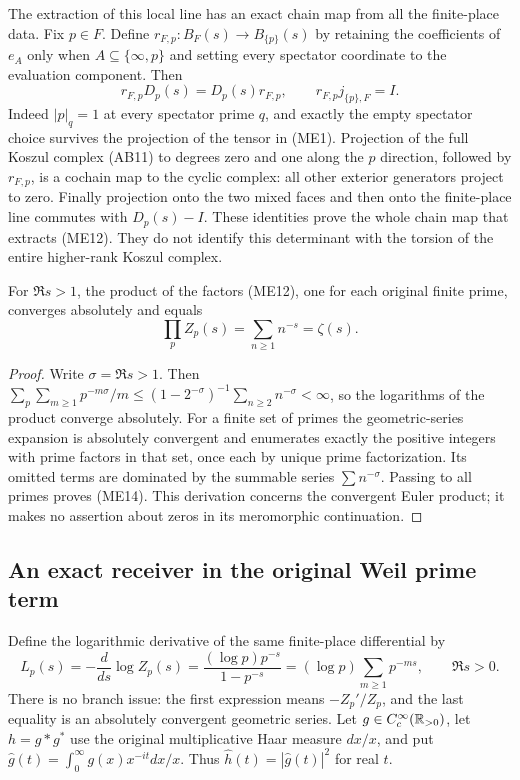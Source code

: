 The extraction of this local line has an exact chain map from all the
finite-place data. Fix $p\in F$. Define
$r_{F,p}:B_F(s)\to B_{\{p\}}(s)$ by retaining the coefficients of
$e_A$ only when $A\subseteq\{\infty,p\}$ and setting every spectator
coordinate to the evaluation component. Then
\[
 r_{F,p}D_p(s)=D_p(s)r_{F,p},\qquad
 r_{F,p}j_{\{p\},F}=I.
 \tag{ME13}
\]
Indeed $|p|_q=1$ at every spectator prime $q$, and exactly the empty
spectator choice survives the projection of the tensor in (ME1).
Projection of the full Koszul complex (AB11) to degrees zero and one
along the $p$ direction, followed by $r_{F,p}$, is a cochain map to
the cyclic complex: all other exterior generators project to zero.
Finally projection onto the two mixed faces and then onto the finite-place
line commutes with $D_p(s)-I$. These identities prove the whole chain map
that extracts (ME12). They do not identify this determinant with the
torsion of the entire higher-rank Koszul complex.

\begin{proposition}
For $\Re s>1$, the product of the factors (ME12), one for each original
finite prime, converges absolutely and equals
\[
 \prod_p Z_p(s)=\sum_{n\ge1}n^{-s}=\zeta(s).
 \tag{ME14}
\]
\end{proposition}
\begin{proof}
Write $\sigma=\Re s>1$. Then
$\sum_p\sum_{m\ge1}p^{-m\sigma}/m
\le(1-2^{-\sigma})^{-1}\sum_{n\ge2}n^{-\sigma}<\infty$,
so the logarithms of the product converge absolutely.
For a finite set of primes the geometric-series expansion is absolutely
convergent and enumerates exactly the positive integers with prime factors
in that set, once each by unique prime factorization. Its omitted terms
are dominated by the summable series $\sum n^{-\sigma}$. Passing to all
primes proves (ME14). This derivation concerns the convergent Euler
product; it makes no assertion about zeros in its meromorphic continuation.
\end{proof}

\subsection{An exact receiver in the original Weil prime term}
Define the logarithmic derivative of the same finite-place differential by
\[
 L_p(s)=-\frac{d}{ds}\log Z_p(s)
 =\frac{(\log p)p^{-s}}{1-p^{-s}}
 =(\log p)\sum_{m\ge1}p^{-ms},\qquad\Re s>0.
 \tag{ME15}\label{eq:ME-log-derivative}
\]
There is no branch issue: the first expression means $-Z_p'/Z_p$,
and the last equality is an absolutely convergent geometric series.
Let $g\in C_c^\infty(\mathbb R_{>0})$, let $h=g*g^*$ use the original
multiplicative Haar measure $dx/x$, and put
$\widehat g(t)=\int_0^\infty g(x)x^{-it}dx/x$. Thus
$\widehat h(t)=|\widehat g(t)|^2$ for real $t$.

